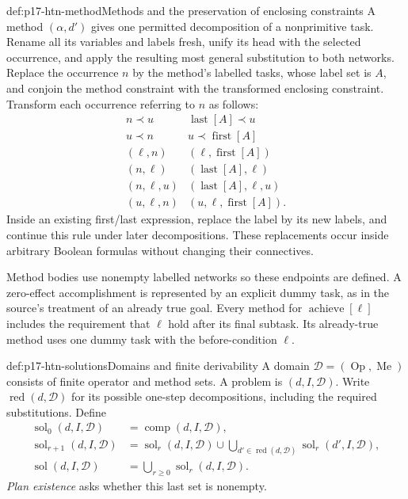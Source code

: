 \begin{hbdefinition}{def:p17-htn-method}{Methods and the preservation of enclosing constraints}
A method \((\alpha,d')\) gives one permitted decomposition of a nonprimitive
task. Rename all its variables and labels fresh, unify its head with the
selected occurrence, and apply the resulting most general substitution to
both networks. Replace the occurrence \(n\) by the method's labelled tasks,
whose label set is \(A\), and conjoin the method constraint with the transformed
enclosing constraint. Transform each occurrence referring to \(n\) as follows:
\[
 \begin{array}{c|c}
 n\prec u&\operatorname{last}[A]\prec u\\
 u\prec n&u\prec\operatorname{first}[A]\\
 (\ell,n)&(\ell,\operatorname{first}[A])\\
 (n,\ell)&(\operatorname{last}[A],\ell)\\
 (n,\ell,u)&(\operatorname{last}[A],\ell,u)\\
 (u,\ell,n)&(u,\ell,\operatorname{first}[A]).
 \end{array}
\]
Inside an existing first/last expression, replace the label by its new labels,
and continue this rule under later decompositions. These replacements occur
inside arbitrary Boolean formulas without changing their connectives.

Method bodies use nonempty labelled networks so these endpoints are defined.
A zero-effect accomplishment is represented by an explicit dummy task, as in
the source's treatment of an already true goal. Every method for
\(\operatorname{achieve}[\ell]\) includes the requirement that \(\ell\)
hold after its final subtask. Its already-true method uses one dummy task with
the before-condition \(\ell\).
\end{hbdefinition}

\begin{hbdefinition}{def:p17-htn-solutions}{Domains and finite derivability}
A domain \(\mathcal D=(\operatorname{Op},\operatorname{Me})\) consists of
finite operator and method sets. A problem is \((d,I,\mathcal D)\).
Write \(\operatorname{red}(d,\mathcal D)\) for its possible one-step
decompositions, including the required substitutions. Define
\[
 \begin{split}
 \operatorname{sol}_0(d,I,\mathcal D)&=\operatorname{comp}(d,I,\mathcal D),\\
 \operatorname{sol}_{r+1}(d,I,\mathcal D)&=
 \operatorname{sol}_r(d,I,\mathcal D)\cup
 \bigcup_{d'\in\operatorname{red}(d,\mathcal D)}
       \operatorname{sol}_r(d',I,\mathcal D),\\
 \operatorname{sol}(d,I,\mathcal D)&=\bigcup_{r\geq0}
       \operatorname{sol}_r(d,I,\mathcal D).
 \end{split}
\]
\emph{Plan existence} asks whether this last set is nonempty.
\end{hbdefinition}


